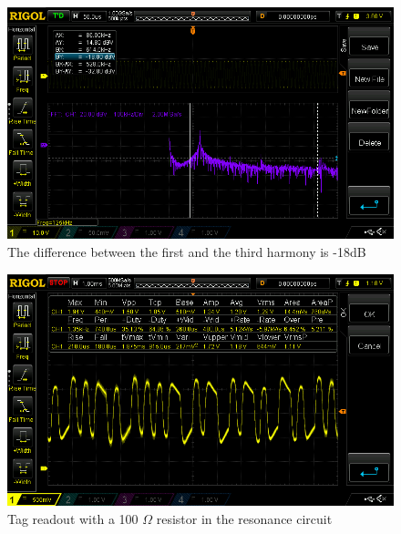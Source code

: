 \begin{figure}
    \centering
    \includegraphics[width=\textwidth]{06_My_Testing_Results/figures/Out_from_transistor/harmony.png}
    \caption{The difference between the first and the third harmony is -18dB}
    \label{fig:06:Harmonies}
\end{figure}

\begin{figure}
    \centering
    \includegraphics[width=\textwidth]{06_My_Testing_Results/figures/RFID_signal_with_different_resistance/100OHM.png}
    \caption{Tag readout with a 100 $\Omega$ resistor in the resonance circuit}
    \label{fig:06:TagReadout100Ohm}
\end{figure}

